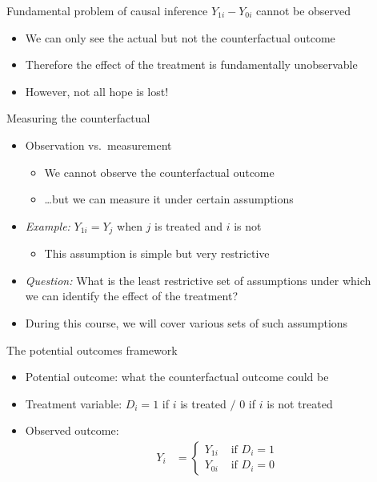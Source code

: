 \documentclass[aspectratio=169,compress,handout,t,xcolor=table]{beamer}
\begin{document}
\begin{frame}[c]
  \begin{block}{Fundamental problem of causal inference}
    \(Y_{1i} - Y_{0i}\) cannot be observed
  \end{block}

  \begin{itemize}
    \item We can only see the actual but not the counterfactual outcome
    \item Therefore the effect of the treatment is fundamentally unobservable
    \item However, not all hope is lost!
  \end{itemize}
\end{frame}

\begin{frame}{Measuring the counterfactual}
  \begin{itemize}
    \item Observation vs.\ measurement
    \begin{itemize}
      \item We cannot observe the counterfactual outcome
      \item \ldots but we can measure it under certain assumptions
    \end{itemize}
    \item \emph{Example:} \(Y_{1i} = Y_j\) when \(j\) is treated and \(i\) is not
    \begin{itemize}
      \item This assumption is simple but very restrictive
    \end{itemize}
    \item \emph{Question:} What is the least restrictive set of assumptions under which \\ we can identify the effect of the treatment?
    \item During this course, we will cover various sets of such assumptions
  \end{itemize}
\end{frame}

\begin{frame}{The potential outcomes framework}
  \begin{itemize}
    \item Potential outcome: what the counterfactual outcome could be
    \item Treatment variable: \(D_i = 1\) if \(i\) is treated \(\big/\) 0 if \(i\) is not treated
    \item Observed outcome:
    \begin{align*}
      Y_i &= \begin{cases}
        Y_{1i} & \text{ if } D_i = 1 \\
        Y_{0i} & \text{ if } D_i = 0
      \end{cases}
    \end{align*}
  \end{itemize}
\end{frame}
\end{document}
